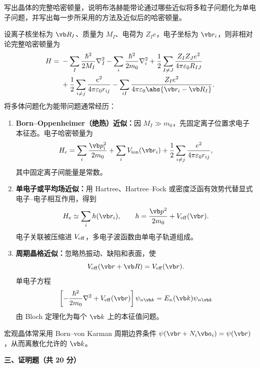 \begin{question}[10 分]
写出晶体的完整哈密顿量，说明布洛赫能带论通过哪些近似将多粒子问题化为单电子问题，并写出每一步所采用的方法及近似后的哈密顿量。


\begin{solution}
设离子核坐标为 $\vb R_I$、质量为 $M_I$、电荷为 $Z_Ie$，电子坐标为 $\vb r_i$，则非相对论完整哈密顿量为
\[
\begin{aligned}
H={}&-\sum_I\frac{\hbar^2}{2M_I}\nabla_I^2
-\sum_i\frac{\hbar^2}{2m_0}\nabla_i^2
+\frac12\sum_{I\ne J}\frac{Z_IZ_Je^2}{4\pi\varepsilon_0R_{IJ}}\\
&+\frac12\sum_{i\ne j}\frac{e^2}{4\pi\varepsilon_0r_{ij}}
-\sum_{iI}\frac{Z_Ie^2}{4\pi\varepsilon_0\abs{\vb r_i-\vb R_I}}.
\end{aligned}
\]
将多体问题化为能带问题通常经历：
\begin{enumerate}
  \item \textbf{Born--Oppenheimer（绝热）近似：}因 $M_I\gg m_0$，先固定离子位置求电子本征态。电子哈密顿量为
  \[
    H_e=\sum_i\frac{\vb p_i^2}{2m_0}+\sum_iV_{\rm ion}(\vb r_i)
    +\frac12\sum_{i\ne j}\frac{e^2}{4\pi\varepsilon_0r_{ij}},
  \]
  其中固定离子间能量是常数。
  \item \textbf{单电子或平均场近似：}用 Hartree、Hartree--Fock 或密度泛函有效势代替显式电子--电子相互作用，得到
  \[
    H_e\simeq\sum_i h(\vb r_i),\qquad
    h=\frac{\vb p^2}{2m_0}+V_{\rm eff}(\vb r).
  \]
  电子关联被压缩进 $V_{\rm eff}$，多电子波函数由单电子轨道组成。
  \item \textbf{周期晶格近似：}忽略热振动、缺陷和表面，使
  \[
    V_{\rm eff}(\vb r+\vb R)=V_{\rm eff}(\vb r).
  \]
  单电子方程
  \[
    \left[-\frac{\hbar^2}{2m_0}\nabla^2+V_{\rm eff}(\vb r)\right]
    \psi_{n\vb k}=E_n(\vb k)\psi_{n\vb k}
  \]
  由 Bloch 定理化为每个 $\vb k$ 上的本征值问题。
\end{enumerate}
宏观晶体常采用 Born--von Karman 周期边界条件
$\psi(\vb r+N_i\vb a_i)=\psi(\vb r)$，从而离散化允许的 $\vb k$。
\end{solution}
\end{question}

\textbf{三、证明题（共 20 分）}

